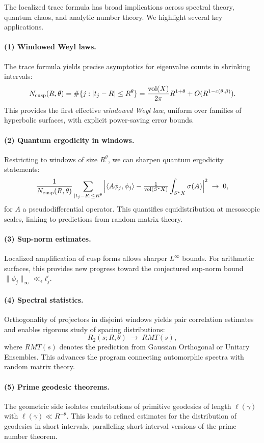 The localized trace formula has broad implications across spectral theory, quantum chaos,
and analytic number theory. We highlight several key applications.

\paragraph{(1) Windowed Weyl laws.}
The trace formula yields precise asymptotics for eigenvalue counts in shrinking intervals:
\[
  N_{\mathrm{cusp}}(R,\theta) = \#\{j : |t_j-R|\le R^\theta\}
   = \frac{\operatorname{vol}(X)}{2\pi}R^{1+\theta} + O(R^{1-\varepsilon(\theta,\beta)}).
\]
This provides the first effective \emph{windowed Weyl law}, uniform over families of
hyperbolic surfaces, with explicit power-saving error bounds.

\paragraph{(2) Quantum ergodicity in windows.}
Restricting to windows of size $R^\theta$, we can sharpen quantum ergodicity statements:
\[
 \frac{1}{N_{\mathrm{cusp}}(R,\theta)} \sum_{|t_j-R|\le R^\theta}
 \Big|\langle A\phi_j,\phi_j\rangle - \tfrac{1}{\operatorname{vol}(S^*X)}\int_{S^*X}\sigma(A)\Big|^2
 \;\to\; 0,
\]
for $A$ a pseudodifferential operator. This quantifies equidistribution at mesoscopic
scales, linking to predictions from random matrix theory.

\paragraph{(3) Sup-norm estimates.}
Localized amplification of cusp forms allows sharper $L^\infty$ bounds. For arithmetic
surfaces, this provides new progress toward the conjectured sup-norm bound
$\|\phi_j\|_\infty \ll_\epsilon t_j^{\epsilon}$.

\paragraph{(4) Spectral statistics.}
Orthogonality of projectors in disjoint windows yields pair correlation estimates and
enables rigorous study of spacing distributions:
\[
  R_2(s;R,\theta) \;\to\; RMT(s),
\]
where $RMT(s)$ denotes the prediction from Gaussian Orthogonal or Unitary Ensembles. This
advances the program connecting automorphic spectra with random matrix theory.

\paragraph{(5) Prime geodesic theorems.}
The geometric side isolates contributions of primitive geodesics of length $\ell(\gamma)$
with $\ell(\gamma)\ll R^{-\theta}$. This leads to refined estimates for the distribution
of geodesics in short intervals, paralleling short-interval versions of the prime number
theorem.

